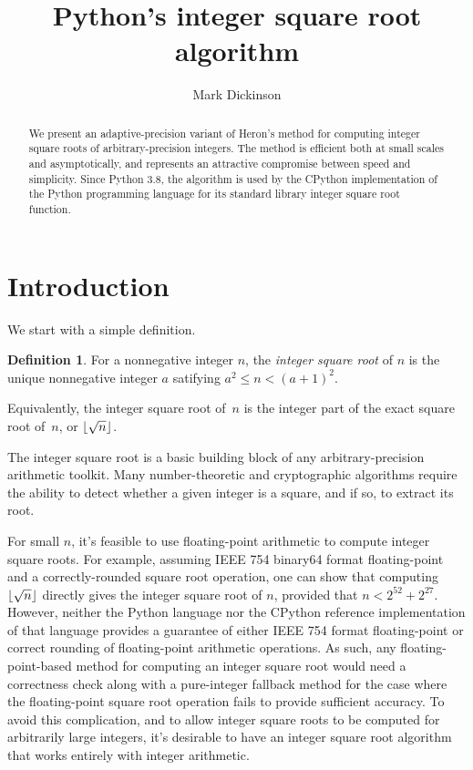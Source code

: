 \documentclass[a4paper]{article}
\title{Python's integer square root algorithm}
\author{Mark Dickinson}
\DeclarePairedDelimiter\floor{\lfloor}{\rfloor}
\theoremstyle{plain}
\theoremstyle{definition}
\newtheorem{definition}[theorem]{Definition}
\begin{document}
\lstset{language=Python}
\maketitle
\begin{abstract}
We present an adaptive-precision variant of Heron's method for computing
integer square roots of arbitrary-precision integers. The method is efficient
both at small scales and asymptotically, and represents an attractive
compromise between speed and simplicity. Since Python 3.8, the algorithm is
used by the CPython implementation of the Python programming language for its
standard library integer square root function.
\end{abstract}
\section{Introduction}

We start with a simple definition.

\begin{definition}
  For a nonnegative integer $n$, the \emph{integer square root} of $n$ is
  the unique nonnegative integer $a$ satifying $a^2 \le n < (a + 1)^2$.
\end{definition}

Equivalently, the integer square root of~$n$ is the integer part of the exact
square root of~$n$, or $\floor{\sqrt n}$.

The integer square root is a basic building block of any arbitrary-precision
arithmetic toolkit. Many number-theoretic and cryptographic algorithms require
the ability to detect whether a given integer is a square, and if so, to
extract its root.

For small $n$, it's feasible to use floating-point arithmetic to
compute integer square roots. For example, assuming IEEE 754 binary64 format
floating-point and a correctly-rounded square root operation, one can show that
computing $\floor{\sqrt n}$ directly gives the integer square root of $n$,
provided that $n < 2^{52} + 2^{27}$. However, neither the Python language nor
the CPython reference implementation of that language provides a guarantee of
either IEEE 754 format floating-point or correct rounding of floating-point
arithmetic operations. As such, any floating-point-based method for computing
an integer square root would need a correctness check along with a pure-integer
fallback method for the case where the floating-point square root operation
fails to provide sufficient accuracy. To avoid this complication, and to allow
integer square roots to be computed for arbitrarily large integers, it's
desirable to have an integer square root algorithm that works entirely with
integer arithmetic.
\end{document}
